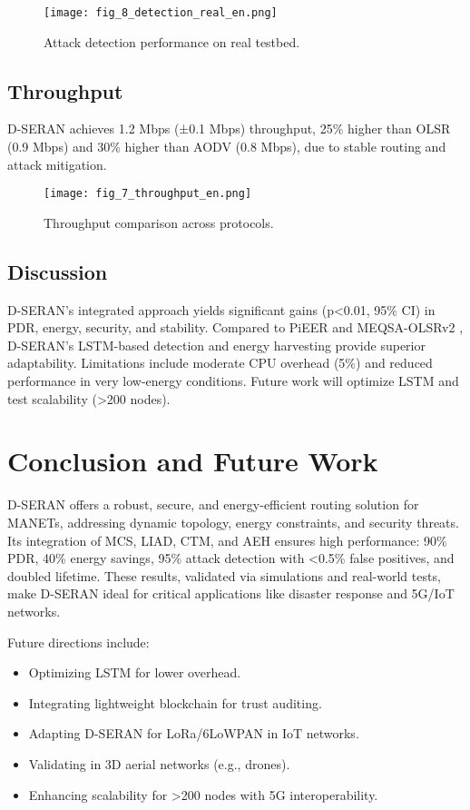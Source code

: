 \documentclass[preprint]{elsarticle}
\begin{document}
\begin{figure}[!t]
    \centering
    \texttt{[image: fig\_8\_detection\_real\_en.png]}
    \caption{Attack detection performance on real testbed.}
    \label{fig:attacks_real}
\end{figure}

\subsection{Throughput}
D-SERAN achieves 1.2 Mbps (±0.1 Mbps) throughput, 25\% higher than OLSR (0.9 Mbps) and 30\% higher than AODV (0.8 Mbps), due to stable routing and attack mitigation.

\begin{figure}[!t]
    \centering
    \texttt{[image: fig\_7\_throughput\_en.png]}
    \caption{Throughput comparison across protocols.}
    \label{fig:throughput}
\end{figure}

\subsection{Discussion}
D-SERAN’s integrated approach yields significant gains (p<0.01, 95\% CI) in PDR, energy, security, and stability. Compared to PiEER \cite{10} and MEQSA-OLSRv2 \cite{11}, D-SERAN’s LSTM-based detection and energy harvesting provide superior adaptability. Limitations include moderate CPU overhead (5\%) and reduced performance in very low-energy conditions. Future work will optimize LSTM and test scalability (>200 nodes).

\section{Conclusion and Future Work}
\label{sec:conclusion}

D-SERAN offers a robust, secure, and energy-efficient routing solution for MANETs, addressing dynamic topology, energy constraints, and security threats. Its integration of MCS, LIAD, CTM, and AEH ensures high performance: 90\% PDR, 40\% energy savings, 95\% attack detection with <0.5\% false positives, and doubled lifetime. These results, validated via simulations and real-world tests, make D-SERAN ideal for critical applications like disaster response and 5G/IoT networks.

Future directions include:
\begin{itemize}
    \item Optimizing LSTM for lower overhead.
    \item Integrating lightweight blockchain for trust auditing.
    \item Adapting D-SERAN for LoRa/6LoWPAN in IoT networks.
    \item Validating in 3D aerial networks (e.g., drones).
    \item Enhancing scalability for >200 nodes with 5G interoperability.
\end{itemize}
\end{document}
